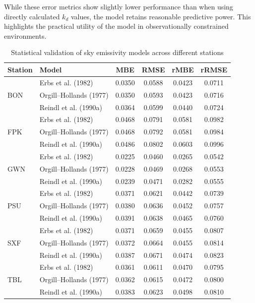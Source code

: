 \documentclass[preprint,12pt]{elsarticle}
\begin{document}
While these error metrics show slightly lower performance than when using directly calculated $k_d$ values, the model retains reasonable predictive power. This highlights the practical utility of the model in observationally constrained environments.

\begin{table}[!htbp]
\centering
\caption{Statistical validation of sky emissivity models across different stations}
\label{tab:validation_statistics}
\renewcommand{\arraystretch}{1.2}
\begin{tabular}{llcccc}
\toprule
\textbf{Station} & \textbf{Model} & \textbf{MBE} & \textbf{RMSE} & \textbf{rMBE} & \textbf{rRMSE} \\
\midrule
\multirow{3}{*}{BON} & Erbs et al. (1982)          & 0.0350 & 0.0588 & 0.0423 & 0.0711 \\
                     & Orgill–Hollands (1977)      & 0.0350 & 0.0593 & 0.0423 & 0.0716 \\
                     & Reindl et al. (1990a)       & 0.0364 & 0.0599 & 0.0440 & 0.0724 \\
\midrule
\multirow{3}{*}{FPK} & Erbs et al. (1982)          & 0.0468 & 0.0791 & 0.0581 & 0.0982 \\
                     & Orgill–Hollands (1977)      & 0.0468 & 0.0792 & 0.0581 & 0.0984 \\
                     & Reindl et al. (1990a)       & 0.0486 & 0.0802 & 0.0603 & 0.0996 \\
\midrule
\multirow{3}{*}{GWN} & Erbs et al. (1982)          & 0.0225 & 0.0460 & 0.0265 & 0.0542 \\
                     & Orgill–Hollands (1977)      & 0.0228 & 0.0469 & 0.0268 & 0.0553 \\
                     & Reindl et al. (1990a)       & 0.0239 & 0.0471 & 0.0282 & 0.0555 \\
\midrule
\multirow{3}{*}{PSU} & Erbs et al. (1982)          & 0.0371 & 0.0621 & 0.0442 & 0.0739 \\
                     & Orgill–Hollands (1977)      & 0.0380 & 0.0636 & 0.0452 & 0.0757 \\
                     & Reindl et al. (1990a)       & 0.0391 & 0.0638 & 0.0465 & 0.0760 \\
\midrule
\multirow{3}{*}{SXF} & Erbs et al. (1982)          & 0.0371 & 0.0659 & 0.0455 & 0.0807 \\
                     & Orgill–Hollands (1977)      & 0.0372 & 0.0664 & 0.0455 & 0.0814 \\
                     & Reindl et al. (1990a)       & 0.0387 & 0.0671 & 0.0474 & 0.0823 \\
\midrule
\multirow{3}{*}{TBL} & Erbs et al. (1982)          & 0.0361 & 0.0611 & 0.0470 & 0.0795 \\
                     & Orgill–Hollands (1977)      & 0.0362 & 0.0615 & 0.0472 & 0.0800 \\
                     & Reindl et al. (1990a)       & 0.0383 & 0.0623 & 0.0498 & 0.0810 \\
\bottomrule
\end{tabular}
\end{table}
\end{document}
